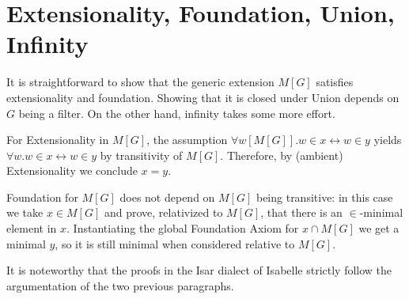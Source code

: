 \section{Extensionality, Foundation, Union, Infinity}
\label{sec:easy-axioms}
\newcommand{\quantRel}[3]{#1 #2\kern -1pt[#3]}
\newcommand{\forallRel}[2]{\quantRel{\forall}{#1}{#2}}
\newcommand{\existsRel}[2]{\quantRel{\exists}{#1}{#2}}

It is straightforward to show that the generic extension $M[G]$
satisfies extensionality and foundation. Showing that it is closed
under Union depends on $G$ being a filter. On the other hand, infinity
takes some more effort.


For Extensionality in $M[G]$, the assumption 
$\forall w[M[G]]. w\in x \leftrightarrow w\in y$ yields 
$\forall w. w\in x \leftrightarrow w\in y$ by transitivity of $M[G]$. %
Therefore, by (ambient) Extensionality we conclude $x=y$. 

Foundation for $M[G]$ does not depend on $M[G]$ being transitive: in
this case we take $x\in M[G]$ and prove, relativized to $M[G]$,  that there is an
$\in$\kern -1pt-minimal element in $x$. Instantiating the global Foundation
Axiom for $x\cap M[G]$ we get a minimal $y$, so it is still minimal
when considered relative to $M[G]$. 

It is noteworthy that the proofs in the Isar dialect of Isabelle
strictly follow the argumentation of the two previous paragraphs.

